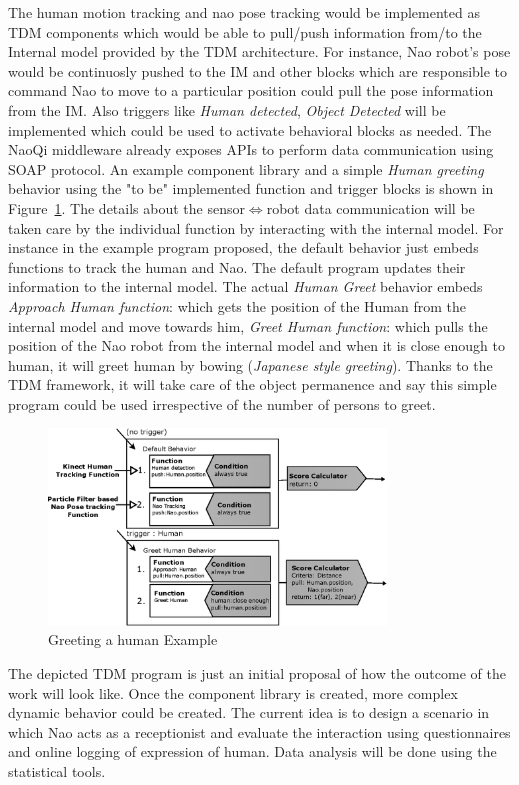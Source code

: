 The human motion tracking and nao pose tracking would be implemented as TDM components which would be able to pull/push information from/to the Internal model provided by the TDM architecture. For instance, Nao robot's pose would be continuosly pushed to the IM and other blocks which are responsible to command Nao to move to a particular position could pull the pose information from the IM. Also triggers like \emph{Human detected}, \emph{Object Detected} will be implemented which could be used to activate behavioral blocks as needed. The NaoQi middleware already exposes APIs to perform data communication using SOAP protocol. An example component library and a simple \emph{Human greeting} behavior using the "to be" implemented function and trigger blocks is shown in Figure~\ref{fig:program}. The details about the sensor$\Leftrightarrow$robot data communication will be taken care by the individual function by interacting with the internal model. For instance in the example program proposed, the default behavior just embeds functions to track the human and Nao. The default program updates their information to the internal model. The actual \emph{Human Greet} behavior embeds \emph{Approach Human function}: which gets the position of the Human from the internal model and move towards him, \emph{Greet Human function}: which pulls the position of the Nao robot from the internal model and when it is close enough to human, it will greet human by bowing (\emph{Japanese style greeting}). Thanks to the TDM framework, it will take care of the object permanence and say this simple program could be used irrespective of the number of persons to greet.
\begin{figure}
\centering
\includegraphics[width=0.8\textwidth]{assets/tdm_example_proposed.eps}
\caption{Greeting a human Example}
\label{fig:program}
\end{figure}	
	The depicted TDM program is just an initial proposal of how the outcome of the work will look like. Once the component library is created, more complex dynamic behavior could be created. The current idea is to design a scenario in which Nao acts as a receptionist and evaluate the interaction using questionnaires and online logging of expression of human. Data analysis will be done using the statistical tools.
